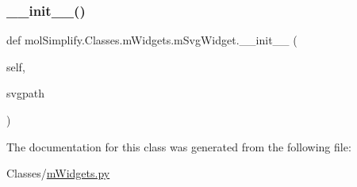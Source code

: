 \subsubsection{\texorpdfstring{\+\_\+\+\_\+init\+\_\+\+\_\+()}{\_\_init\_\_()}}
{\footnotesize\ttfamily def mol\+Simplify.\+Classes.\+m\+Widgets.\+m\+Svg\+Widget.\+\_\+\+\_\+init\+\_\+\+\_\+ (\begin{DoxyParamCaption}\item[{}]{self,  }\item[{}]{svgpath }\end{DoxyParamCaption})}



The documentation for this class was generated from the following file\+:\begin{DoxyCompactItemize}
\item 
Classes/\hyperlink{mWidgets_8py}{m\+Widgets.\+py}\end{DoxyCompactItemize}
